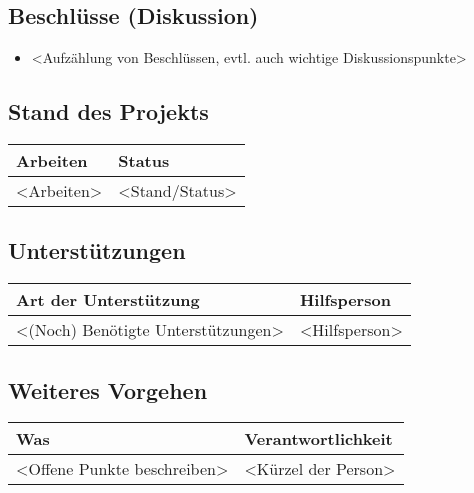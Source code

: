 \vspace{1cm}

\subsection*{Beschlüsse (Diskussion)}
\begin{itemize}
    \item <Aufzählung von Beschlüssen, evtl. auch wichtige Diskussionspunkte>
\end{itemize}


\clearpage


\subsection*{Stand des Projekts}
\begin{table}[H]
    \centering
    \begin{tabular}{p{12cm} p{4cm}}
        \textbf{Arbeiten} & \textbf{Status} \\ \hline
        <Arbeiten> & <Stand/Status> \\ \hline
    \end{tabular}
\end{table}

\vspace{1cm}

\subsection*{Unterstützungen}
\begin{table}[H]
    \centering
    \begin{tabular}{p{12cm} p{4cm}}
        \textbf{Art der Unterstützung} & \textbf{Hilfsperson} \\ \hline
        <(Noch) Benötigte Unterstützungen> & <Hilfsperson> \\ \hline
    \end{tabular}
\end{table}

\vspace{1cm}

\subsection*{Weiteres Vorgehen}
\begin{table}[H]
    \centering
    \begin{tabular}{p{12cm} p{4cm}}
        \textbf{Was} & \textbf{Verantwortlichkeit} \\ \hline
        <Offene Punkte beschreiben> & <Kürzel der Person> \\ \hline
    \end{tabular}
\end{table}

